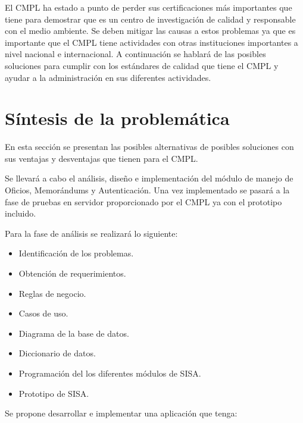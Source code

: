 El CMPL ha estado a punto de perder sus certificaciones más importantes que tiene para demostrar que es un centro de investigación de calidad y responsable con el medio ambiente. Se deben mitigar las causas a estos problemas ya que es importante que el CMPL tiene actividades con otras instituciones importantes a nivel nacional e internacional. A continuación se hablará de las posibles soluciones para cumplir con los estándares de calidad que tiene el CMPL y ayudar a la administración en sus diferentes actividades. 

\section{Síntesis de la problemática}

En esta sección se presentan las posibles alternativas de posibles soluciones con sus ventajas y desventajas que tienen para el CMPL.



Se llevará a cabo el análisis, diseño e implementación del módulo de manejo de Oficios, Memorándums y Autenticación. Una vez implementado se pasará a la fase de pruebas en servidor proporcionado por el CMPL ya con el prototipo incluido.

Para la fase de análisis se realizará lo siguiente:
\begin{itemize}
	\item Identificación de los problemas.
	\item Obtención de requerimientos.
	\item Reglas de negocio.
	\item Casos de uso.
	\item Diagrama de la base de datos.
	\item Diccionario de datos.
	\item Programación del los diferentes módulos de SISA.
	\item Prototipo de SISA.
\end{itemize}

Se propone desarrollar e implementar una aplicación que tenga:
	
